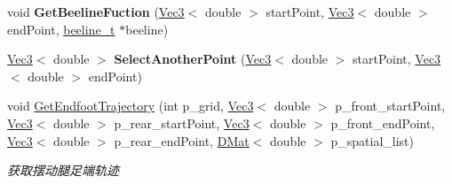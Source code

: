 \begin{DoxyCompactItemize}
\mbox{\label{classquadruped_1_1EndfootTrajectory_a8efd46aefe9b2a959d8ea8944c437db7}} 
void {\bfseries Get\+Beeline\+Fuction} (\hyperlink{cppTypes_8h_a65c27bf97693676535dd0b30ea0ad399}{Vec3}$<$ double $>$ start\+Point, \hyperlink{cppTypes_8h_a65c27bf97693676535dd0b30ea0ad399}{Vec3}$<$ double $>$ end\+Point, \hyperlink{structbeeline__t}{beeline\+\_\+t} $\ast$beeline)
\item 
\mbox{\label{classquadruped_1_1EndfootTrajectory_ad2728987b4fee1ef4f234ce8c8faad73}} 
\hyperlink{cppTypes_8h_a65c27bf97693676535dd0b30ea0ad399}{Vec3}$<$ double $>$ {\bfseries Select\+Another\+Point} (\hyperlink{cppTypes_8h_a65c27bf97693676535dd0b30ea0ad399}{Vec3}$<$ double $>$ start\+Point, \hyperlink{cppTypes_8h_a65c27bf97693676535dd0b30ea0ad399}{Vec3}$<$ double $>$ end\+Point)
\item 
void \hyperlink{classquadruped_1_1EndfootTrajectory_a1fa9a93f47cd777141b592f461218865}{Get\+Endfoot\+Trajectory} (int p\+\_\+grid, \hyperlink{cppTypes_8h_a65c27bf97693676535dd0b30ea0ad399}{Vec3}$<$ double $>$ p\+\_\+front\+\_\+start\+Point, \hyperlink{cppTypes_8h_a65c27bf97693676535dd0b30ea0ad399}{Vec3}$<$ double $>$ p\+\_\+rear\+\_\+start\+Point, \hyperlink{cppTypes_8h_a65c27bf97693676535dd0b30ea0ad399}{Vec3}$<$ double $>$ p\+\_\+front\+\_\+end\+Point, \hyperlink{cppTypes_8h_a65c27bf97693676535dd0b30ea0ad399}{Vec3}$<$ double $>$ p\+\_\+rear\+\_\+end\+Point, \hyperlink{cppTypes_8h_a5db6bfb25afa103db1fb6bb6287ae9d7}{D\+Mat}$<$ double $>$ p\+\_\+spatial\+\_\+list)
\begin{DoxyCompactList}\small\item\em 获取摆动腿足端轨迹 \end{DoxyCompactList}\end{DoxyCompactItemize}
